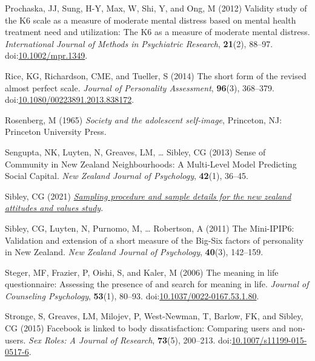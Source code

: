 \documentclass[
  singlecolumn,
  9pt]{scrartcl}
\newlength{\cslhangindent}
\newenvironment{CSLReferences}[2] %
 {\begin{list}{}{%
  \setlength{\itemindent}{0pt}
  \setlength{\leftmargin}{0pt}
  \setlength{\parsep}{0pt}
  \ifodd #1
   \setlength{\leftmargin}{\cslhangindent}
   \setlength{\itemindent}{-1\cslhangindent}
  \fi
  \setlength{\itemsep}{#2\baselineskip}}}
 {\end{list}}
\begin{document}
\begin{CSLReferences}{1}{0}
Prochaska, JJ, Sung, H-Y, Max, W, Shi, Y, and Ong, M (2012) Validity
study of the K6 scale as a measure of moderate mental distress based on
mental health treatment need and utilization: The K6 as a measure of
moderate mental distress. \emph{International Journal of Methods in
Psychiatric Research}, \textbf{21}(2), 88--97.
doi:\href{https://doi.org/10.1002/mpr.1349}{10.1002/mpr.1349}.

Rice, KG, Richardson, CME, and Tueller, S (2014) The short form of the
revised almost perfect scale. \emph{Journal of Personality Assessment},
\textbf{96}(3), 368--379.
doi:\href{https://doi.org/10.1080/00223891.2013.838172}{10.1080/00223891.2013.838172}.

Rosenberg, M (1965) \emph{Society and the adolescent self-image},
Princeton, NJ: Princeton University Press.

Sengupta, NK, Luyten, N, Greaves, LM, \ldots{} Sibley, CG (2013) Sense
of Community in New Zealand Neighbourhoods: A Multi-Level Model
Predicting Social Capital. \emph{New Zealand Journal of Psychology},
\textbf{42}(1), 36--45.

Sibley, CG (2021)
\emph{\href{https://doi.org/10.31234/osf.io/wgqvy}{Sampling procedure
and sample details for the new zealand attitudes and values study}}.

Sibley, CG, Luyten, N, Purnomo, M, \ldots{} Robertson, A (2011) The
Mini-IPIP6: Validation and extension of a short measure of the Big-Six
factors of personality in New Zealand. \emph{New Zealand Journal of
Psychology}, \textbf{40}(3), 142--159.

Steger, MF, Frazier, P, Oishi, S, and Kaler, M (2006) The meaning in
life questionnaire: Assessing the presence of and search for meaning in
life. \emph{Journal of Counseling Psychology}, \textbf{53}(1), 80--93.
doi:\href{https://doi.org/10.1037/0022-0167.53.1.80}{10.1037/0022-0167.53.1.80}.

Stronge, S, Greaves, LM, Milojev, P, West-Newman, T, Barlow, FK, and
Sibley, CG (2015) Facebook is linked to body dissatisfaction: Comparing
users and non-users. \emph{Sex Roles: A Journal of Research},
\textbf{73}(5), 200--213.
doi:\href{https://doi.org/10.1007/s11199-015-0517-6}{10.1007/s11199-015-0517-6}.


\end{CSLReferences}
\end{document}

